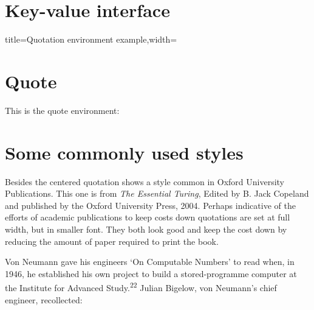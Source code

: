 \section{Key-value interface}

\vfill

\begin{tcblisting}{title=Quotation environment example,width=\textwidth}
\lorem

\begin{quotation}
\lipsum[2-3]
\end{quotation}
\end{tcblisting}

\section{Quote}
This is the quote environment:
\begin{quote}
\lipsum[1-2]
\end{quote}


\section{Some commonly used styles}

Besides the centered quotation  shows a style
common in Oxford University Publications. This one is from \textit{The Essential Turing}, Edited by B. Jack Copeland and  published by the Oxford University Press, 2004. Perhaps indicative of the efforts of academic publications to keep costs down quotations are set at full width, but in smaller font. They both look good and keep the cost down by reducing the amount of paper required to print the book.

\topline

Von Neumann gave his engineers `On Computable Numbers' to read when, in
1946, he established his own project to build a stored-programme computer at
the Institute for Advanced Study.\textsuperscript{22} Julian Bigelow, von Neumann's chief engineer,
recollected:
\vspace*{-20pt}

